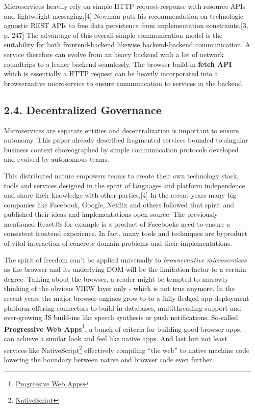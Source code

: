 \documentclass[]{article}
\begin{document}
Microservices heavily rely on simple HTTP request-response with resource
APIs and lightweight messaging.{[}4{]} Newman puts his recommendation on
technologic-agnostic REST APIs to free data persistence from
implementation constraints.{[}3, p. 247{]} The advantage of this overall
simple communication model is the suitability for both frontend-backend
likewise backend-backend communication. A service therefore can evolve
from an heavy backend with a lot of network roundtrips to a leaner
backend seamlessly. The browser build-in \textbf{fetch API} which is
essentially a HTTP request can be heavily incorporated into a
browsernative microservice to ensure communication to services in the
backend.

\subsection{2.4. Decentralized
Governance}\label{decentralized-governance}

Microservices are separate entities and decentralization is important to
ensure autonomy. This paper already described fragmented services
bounded to singular business context choreographed by simple
communication protocols developed and evolved by autonomous teams.

This distributed nature empowers teams to create their own technology
stack, tools and services designed in the spirit of language- and
platform independence and share their knowledge with other
parties.{[}4{]} In the recent years many big companies like Facebook,
Google, Netflix and others followed that spirit and published their
ideas and implementations open source. The previously mentioned ReactJS
for example is a product of Facebooks need to ensure a consistent
frontend experience. In fact, many tools and techniques are byproduct of
vital interaction of concrete domain problems and their implementations.

The spirit of freedom can't be applied universally to
\emph{browsernative microservices} as the browser and its underlying DOM
will be the limitation factor to a certain degree. Talking about the
browser, a reader might be tempted to narrowly thinking of the obvious
VIEW layer only - which is not true anymore. In the recent years the
major browser engines grow to to a fully-fledged app deployment platform
offering connectors to build-in databases, multithreading support and
ever-growing JS build-ins like speech synthesis or push notifications.
So-called \textbf{Progressive Web Apps}\footnote{\href{https://developers.google.com/web/progressive-web-apps}{Progressive
  Web Apps}}, a bunch of criteria for building good browser apps, can
achieve a similar look and feel like native apps. And last but not least
services like NativeScript\footnote{\href{https://www.nativescript.org}{NativeScript}}
effectively compiling ``the web'' to native machine code lowering the
boundary between native and browser code even further.
\end{document}
